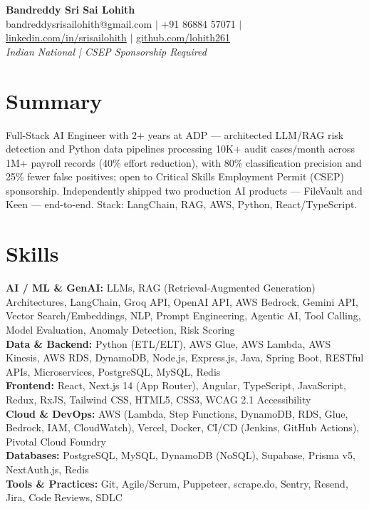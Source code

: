 \documentclass[10pt,letterpaper]{article}
\newcommand{\skillrow}[2]{\textbf{#1:} #2 \\[1pt]}
\begin{document}
\begin{center}
  {\Huge\bfseries Bandreddy Sri Sai Lohith}\\[3pt]
  \small bandreddysrisailohith@gmail.com $\vert$\; +91 86884 57071 $\vert$\; \href{https://linkedin.com/in/srisailohith}{linkedin.com/in/srisailohith} $\vert$\; \href{https://github.com/lohith261}{github.com/lohith261} \\[2pt]
  \small\textit{Indian National | CSEP Sponsorship Required}
\end{center}

\section{Summary}

Full-Stack AI Engineer with 2+ years at ADP --- architected LLM/RAG risk detection and Python data pipelines processing 10K+ audit cases/month across 1M+ payroll records (40\% effort reduction), with 80\% classification precision and 25\% fewer false positives; open to Critical Skills Employment Permit (CSEP) sponsorship.
      Independently shipped two production AI products --- FileVault and Keen --- end-to-end. Stack: LangChain, RAG, AWS, Python, React/TypeScript.

\section{Skills}

\skillrow{AI / ML \& GenAI}{LLMs, RAG (Retrieval-Augmented Generation) Architectures, LangChain, Groq API, OpenAI API, AWS Bedrock, Gemini API, Vector Search/Embeddings, NLP, Prompt Engineering, Agentic AI, Tool Calling, Model Evaluation, Anomaly Detection, Risk Scoring}
\skillrow{Data \& Backend}{Python (ETL/ELT), AWS Glue, AWS Lambda, AWS Kinesis, AWS RDS, DynamoDB, Node.js, Express.js, Java, Spring Boot, RESTful APIs, Microservices, PostgreSQL, MySQL, Redis}
\skillrow{Frontend}{React, Next.js 14 (App Router), Angular, TypeScript, JavaScript, Redux, RxJS, Tailwind CSS, HTML5, CSS3, WCAG 2.1 Accessibility}
\skillrow{Cloud \& DevOps}{AWS (Lambda, Step Functions, DynamoDB, RDS, Glue, Bedrock, IAM, CloudWatch), Vercel, Docker, CI/CD (Jenkins, GitHub Actions), Pivotal Cloud Foundry}
\skillrow{Databases}{PostgreSQL, MySQL, DynamoDB (NoSQL), Supabase, Prisma v5, NextAuth.js, Redis}
\skillrow{Tools \& Practices}{Git, Agile/Scrum, Puppeteer, scrape.do, Sentry, Resend, Jira, Code Reviews, SDLC}
\end{document}
